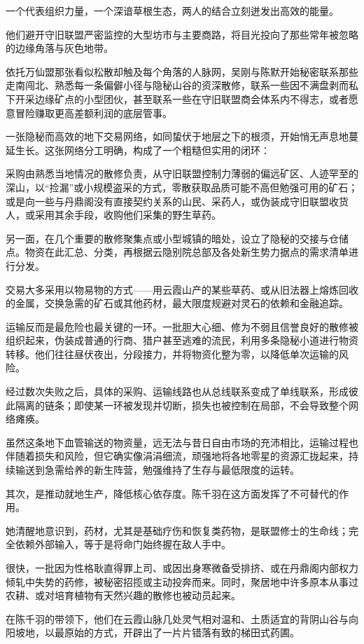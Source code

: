 一个代表组织力量，一个深谙草根生态，两人的结合立刻迸发出高效的能量。

他们避开守旧联盟严密监控的大型坊市与主要商路，将目光投向了那些常年被忽略的边缘角落与灰色地带。

依托万仙盟那张看似松散却触及每个角落的人脉网，吴刚与陈默开始秘密联系那些走南闯北、熟悉每一条偏僻小径与隐秘山谷的资深散修，联系一些因不满盘剥而私下开采边缘矿点的小型团伙，甚至联系一些在守旧联盟商会体系内不得志，或者愿意冒险赚取更高差额利润的底层管事。

一张隐秘而高效的地下交易网络，如同蛰伏于地层之下的根须，开始悄无声息地蔓延生长。这张网络分工明确，构成了一个粗糙但实用的闭环：

采购由熟悉当地情况的散修负责，从守旧联盟控制力薄弱的偏远矿区、人迹罕至的深山，以“捡漏”或小规模盗采的方式，零散获取品质可能不高但勉强可用的矿石；或是向一些与丹鼎阁没有直接契约关系的山民、采药人，或伪装成守旧联盟收货人，或采用其余手段，收购他们采集的野生草药。

另一面，在几个重要的散修聚集点或小型城镇的暗处，设立了隐秘的交接与仓储点。物资在此汇总、分类，再根据云隐别院总部及各处新生势力据点的需求清单进行分发。

交易大多采用以物易物的方式——用云霞山产的某些草药、或从旧法器上熔炼回收的金属，交换急需的矿石或其他药材，最大限度规避对灵石的依赖和金融追踪。

运输反而是最危险也最关键的一环。一批胆大心细、修为不弱且信誉良好的散修被组织起来，伪装成普通的行商、猎户甚至逃难的流民，利用多条隐秘小道进行物资转移。他们往往昼伏夜出，分段接力，并将物资化整为零，以降低单次运输的风险。

经过数次失败之后，具体的采购、运输线路也从总线联系变成了单线联系，形成彼此隔离的链条；即使某一环被发现并切断，损失也被控制在局部，不会导致整个网络瘫痪。

虽然这条地下血管输送的物资量，远无法与昔日自由市场的充沛相比，运输过程也伴随着损失和风险，但它确实像涓涓细流，顽强地将各地零星的资源汇拢起来，持续输送到急需给养的新生阵营，勉强维持了生存与最低限度的运转。

其次，是推动就地生产，降低核心依存度。陈千羽在这方面发挥了不可替代的作用。

她清醒地意识到，药材，尤其是基础疗伤和恢复类药物，是联盟修士的生命线；完全依赖外部输入，等于是将命门始终握在敌人手中。

很快，一批因为性格耿直得罪上司、或因出身寒微备受排挤、或在丹鼎阁内部权力倾轧中失势的药修，被秘密招揽或主动投奔而来。同时，聚居地中许多原本从事过农耕、或对培育植物有天然兴趣的散修也被动员起来。

在陈千羽的带领下，他们在云霞山脉几处灵气相对温和、土质适宜的背阴山谷与向阳坡地，以最原始的方式，开辟出了一片片错落有致的梯田式药圃。

